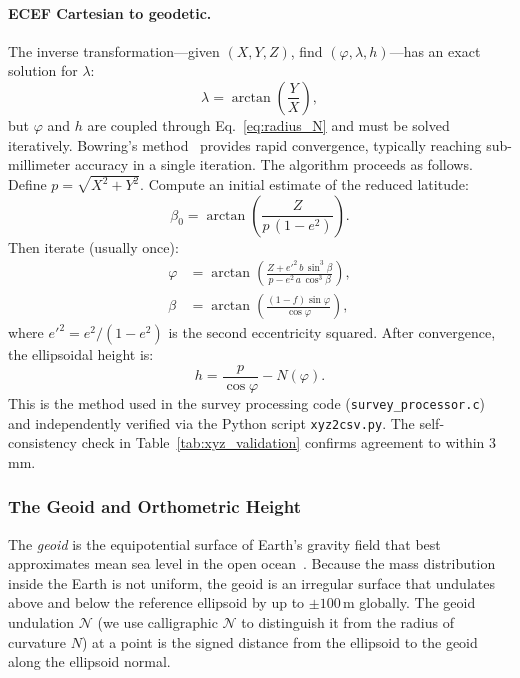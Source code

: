 \paragraph{ECEF Cartesian to geodetic.} The inverse transformation---given $(X, Y, Z)$, find $(\varphi, \lambda, h)$---has an exact solution for $\lambda$:
\begin{equation}
\lambda = \arctan\!\left(\frac{Y}{X}\right),
\label{eq:xyz2geod_lam}
\end{equation}
but $\varphi$ and $h$ are coupled through Eq.~\eqref{eq:radius_N} and must be solved iteratively. Bowring's method~\cite{bowring1976} provides rapid convergence, typically reaching sub-millimeter accuracy in a single iteration. The algorithm proceeds as follows. Define $p = \sqrt{X^2 + Y^2}$. Compute an initial estimate of the reduced latitude:
\begin{equation}
\beta_0 = \arctan\!\left(\frac{Z}{p\,(1 - e^2)}\right).
\label{eq:bowring_beta0}
\end{equation}
Then iterate (usually once):
\begin{align}
\varphi &= \arctan\!\left(\frac{Z + e'^2\,b\,\sin^3\!\beta}{p - e^2\,a\,\cos^3\!\beta}\right), \label{eq:bowring_phi}\\
\beta &= \arctan\!\left(\frac{(1-f)\sin\varphi}{\cos\varphi}\right), \label{eq:bowring_beta}
\end{align}
where $e'^2 = e^2/(1-e^2)$ is the second eccentricity squared. After convergence, the ellipsoidal height is:
\begin{equation}
h = \frac{p}{\cos\varphi} - N(\varphi).
\label{eq:bowring_h}
\end{equation}
This is the method used in the survey processing code (\texttt{survey\_processor.c}) and independently verified via the Python script \texttt{xyz2csv.py}. The self-consistency check in Table~\ref{tab:xyz_validation} confirms agreement to within 3\,mm.

\subsubsection{The Geoid and Orthometric Height}
\label{sec:geoid}

The \emph{geoid} is the equipotential surface of Earth's gravity field that best approximates mean sea level in the open ocean~\cite{torge2012}. Because the mass distribution inside the Earth is not uniform, the geoid is an irregular surface that undulates above and below the reference ellipsoid by up to $\pm 100$\,m globally. The geoid undulation $\mathcal{N}$ (we use calligraphic $\mathcal{N}$ to distinguish it from the radius of curvature $N$) at a point is the signed distance from the ellipsoid to the geoid along the ellipsoid normal.

